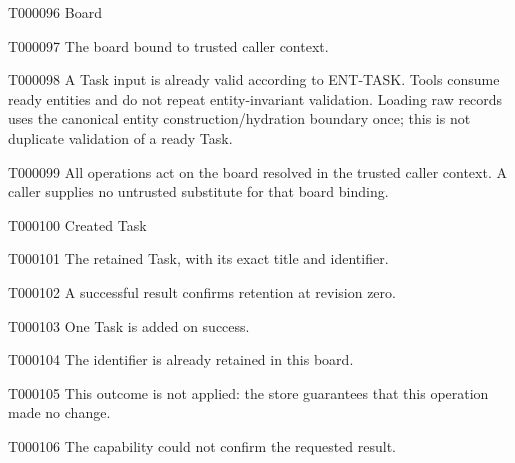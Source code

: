 \documentclass[11pt,a4paper]{article}
\begin{document}
\begin{atlastext}{T000096}
Board
\end{atlastext}
\begin{atlasparagraph}{T000097}
The board bound to trusted caller context.
\end{atlasparagraph}
\begin{atlasparagraph}{T000098}
A Task input is already valid according to ENT-TASK. Tools consume ready entities and do not repeat entity-invariant validation. Loading raw records uses the canonical entity construction/hydration boundary once; this is not duplicate validation of a ready Task.
\end{atlasparagraph}
\begin{atlasparagraph}{T000099}
All operations act on the board resolved in the trusted caller context. A caller supplies no untrusted substitute for that board binding.
\end{atlasparagraph}
\begin{atlastext}{T000100}
Created Task
\end{atlastext}
\begin{atlasparagraph}{T000101}
The retained Task, with its exact title and identifier.
\end{atlasparagraph}
\begin{atlasparagraph}{T000102}
A successful result confirms retention at revision zero.
\end{atlasparagraph}
\begin{atlasparagraph}{T000103}
One Task is added on success.
\end{atlasparagraph}
\begin{atlasparagraph}{T000104}
The identifier is already retained in this board.
\end{atlasparagraph}
\begin{atlasparagraph}{T000105}
This outcome is not applied: the store guarantees that this operation made no change.
\end{atlasparagraph}
\begin{atlasparagraph}{T000106}
The capability could not confirm the requested result.
\end{atlasparagraph}
\end{document}
